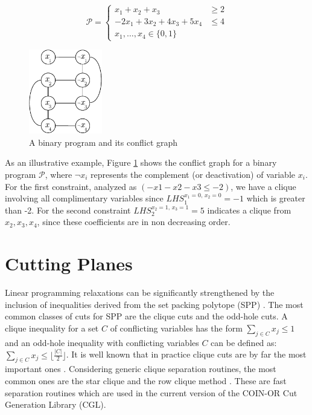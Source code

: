 \documentclass{endm}
\begin{document}
\begin{figure}[h]
\begin{minipage}[b]{.5\textwidth}
\[
\mathcal{P} = \left\{
\begin{array}{lr}
x_1+x_2+x_3 & \geq 2 \\
-2x_{1}+3x_{2}+4x_{3}+5x_{4} & \leq 4 \\
x_{1},\ldots,x_{4}\in\{0,1\}
\end{array}
\right.
\]

\end{minipage}
\begin{minipage}{.5\textwidth}
	\centering
	\includegraphics[width=3.2cm]{cGraph.pdf}
\end{minipage}
\caption{A binary program and its conflict graph}\label{graph}
\end{figure}


As an illustrative example, Figure \ref{graph} shows the conflict graph for a binary program $\mathcal{P}$, where $\neg x_i$ represents the complement (or deactivation) of variable $x_i$.  For the first constraint, analyzed as $(-x1-x2-x3\leq-2)$, we have a clique involving all complimentary variables since $LHS_1^{x_1=0,\, x_2=0}=-1$ which is greater than -2. For the second constraint $LHS_2^{x_2=1,\, x_3=1}=5$ indicates a clique from $x_2,x_3,x_4$, since these coefficients are in non decreasing order.

\section{Cutting Planes}\label{cut}

Linear programming relaxations can be significantly strengthened by the inclusion of inequalities derived from the set packing polytope (SPP) \cite {Padberg1973}. The most common classes of cuts for SPP are the clique cuts and the odd-hole cuts. A clique inequality for a set $C$ of conflicting variables has the form $\sum_{j\in C}x_{j} \leq 1$ and an odd-hole inequality with conflicting variables $C$ can be defined as: $\sum_{j\in C}x_{j} \leq \lfloor \frac{|C|}{2}\rfloor$. It is well known that in practice clique cuts are by far the most important ones \cite{Borndorfer1998}. Considering generic clique separation routines, the most common ones are the star clique and the row clique method \cite{Eso1999a,Hoffman1993,Borndorfer1998}. These are fast separation routines which are used in the current version of the COIN-OR\cite{LougeeHeimer2003} Cut Generation Library (CGL).  
\end{document}

